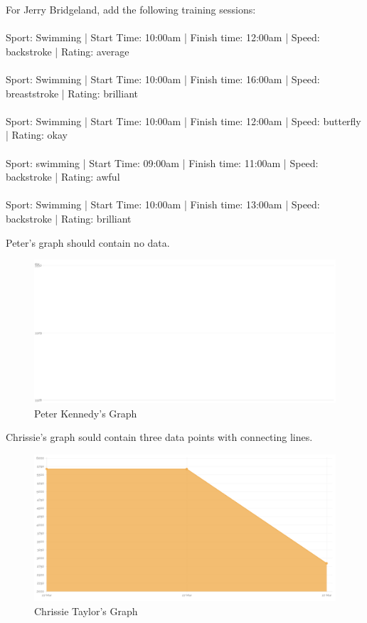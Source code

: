 \documentclass{article}[12pt,a4paper]
\begin{document}
{\begin{framed}
For Jerry Bridgeland, add the following training sessions:\\\\
Sport: Swimming | Start Time: 10:00am | Finish time: 12:00am | Speed: backstroke | Rating: average\\\\
Sport: Swimming | Start Time: 10:00am | Finish time: 16:00am | Speed: breaststroke | Rating: brilliant\\\\
Sport: Swimming | Start Time: 10:00am | Finish time: 12:00am | Speed: butterfly | Rating: okay\\\\
Sport: swimming | Start Time: 09:00am | Finish time: 11:00am | Speed: backstroke | Rating: awful\\\\
Sport: Swimming | Start Time: 10:00am | Finish time: 13:00am | Speed: backstroke | Rating: brilliant
\end{framed}

Peter's graph should contain no data.

\begin{figure}[h!]
    \includegraphics[scale=0.33]{images/testing/graphs/peter}
    \caption{Peter Kennedy's Graph}
\end{figure}

\clearpage

Chrissie's graph sould contain three data points with connecting lines.

\begin{figure}[h!]
    \includegraphics[scale=0.33]{images/testing/graphs/chrissie}
    \caption{Chrissie Taylor's Graph}
\end{figure}

}
\end{document}

